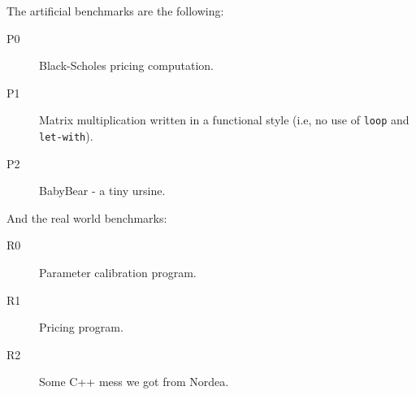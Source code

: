 The artificial benchmarks are the following:

\begin{description}
\item[P0] Black-Scholes\cite{black1973pricing} pricing computation.

\item[P1] Matrix multiplication written in a functional style (i.e, no
  use of \texttt{loop} and \texttt{let-with}).

\item[P2] BabyBear - a tiny ursine.
\end{description}

And the real world benchmarks:

\begin{description}
\item[R0] Parameter calibration program.

\item[R1] Pricing program.

\item[R2] Some C++ mess we got from Nordea.
\end{description}

